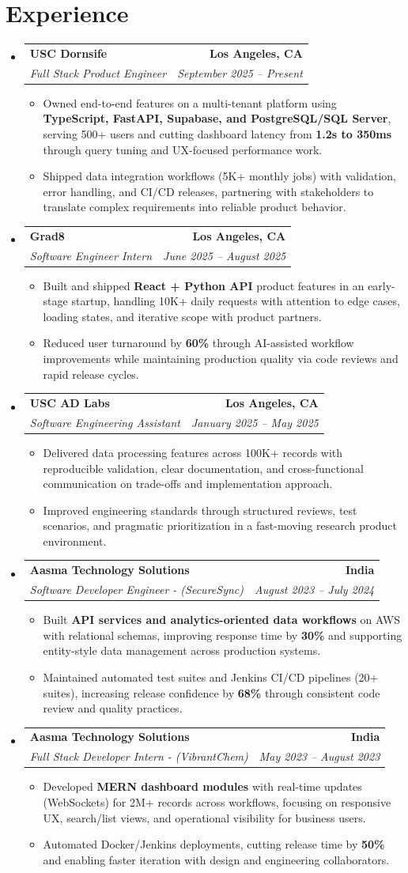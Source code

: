 \documentclass[letterpaper,10pt]{article}
\makeatletter
\newcommand{\resumeItem}[1]{\item\small{{#1 \vspace{-2pt}}}}
\newcommand{\resumeSubheading}[4]{\vspace{-1pt}\item\begin{tabular*}{1.0\textwidth}[t]{l@{\extracolsep{\fill}}r}\textbf{#1} & \textbf{\small #2} \\\textit{\small#3} & \textit{\small #4} \\\end{tabular*}\vspace{-2pt}}
\newcommand{\resumeSubHeadingListStart}{\begin{itemize}[leftmargin=0.0in, label={}]}
\newcommand{\resumeSubHeadingListEnd}{\end{itemize}}
\newcommand{\resumeItemListStart}{\begin{itemize}[leftmargin=0.15in,label=\textbullet,itemsep=2pt,topsep=0pt,parsep=0pt,partopsep=0pt]}
\newcommand{\resumeItemListEnd}{\end{itemize}\vspace{-4pt}}
\makeatother
\begin{document}
\section{Experience}
\resumeSubHeadingListStart
\resumeSubheading{USC Dornsife}{Los Angeles, CA}{Full Stack Product Engineer}{September 2025 -- Present}
\resumeItemListStart
\resumeItem{Owned end-to-end features on a multi-tenant platform using \textbf{TypeScript, FastAPI, Supabase, and PostgreSQL/SQL Server}, serving 500+ users and cutting dashboard latency from \textbf{1.2s to 350ms} through query tuning and UX-focused performance work.}
\resumeItem{Shipped data integration workflows (5K+ monthly jobs) with validation, error handling, and CI/CD releases, partnering with stakeholders to translate complex requirements into reliable product behavior.}
\resumeItemListEnd
\resumeSubheading{Grad8}{Los Angeles, CA}{Software Engineer Intern}{June 2025 -- August 2025}
\resumeItemListStart
\resumeItem{Built and shipped \textbf{React + Python API} product features in an early-stage startup, handling 10K+ daily requests with attention to edge cases, loading states, and iterative scope with product partners.}
\resumeItem{Reduced user turnaround by \textbf{60\%} through AI-assisted workflow improvements while maintaining production quality via code reviews and rapid release cycles.}
\resumeItemListEnd
\resumeSubheading{USC AD Labs}{Los Angeles, CA}{Software Engineering Assistant}{January 2025 -- May 2025}
\resumeItemListStart
\resumeItem{Delivered data processing features across 100K+ records with reproducible validation, clear documentation, and cross-functional communication on trade-offs and implementation approach.}
\resumeItem{Improved engineering standards through structured reviews, test scenarios, and pragmatic prioritization in a fast-moving research product environment.}
\resumeItemListEnd
\resumeSubheading{Aasma Technology Solutions}{India}{Software Developer Engineer - (SecureSync)}{August 2023 -- July 2024}
\resumeItemListStart
\resumeItem{Built \textbf{API services and analytics-oriented data workflows} on AWS with relational schemas, improving response time by \textbf{30\%} and supporting entity-style data management across production systems.}
\resumeItem{Maintained automated test suites and Jenkins CI/CD pipelines (20+ suites), increasing release confidence by \textbf{68\%} through consistent code review and quality practices.}
\resumeItemListEnd
\resumeSubheading{Aasma Technology Solutions}{India}{Full Stack Developer Intern - (VibrantChem)}{May 2023 -- August 2023}
\resumeItemListStart
\resumeItem{Developed \textbf{MERN dashboard modules} with real-time updates (WebSockets) for 2M+ records across workflows, focusing on responsive UX, search/list views, and operational visibility for business users.}
\resumeItem{Automated Docker/Jenkins deployments, cutting release time by \textbf{50\%} and enabling faster iteration with design and engineering collaborators.}
\resumeItemListEnd
\resumeSubHeadingListEnd
\vspace{-14pt}
\end{document}
